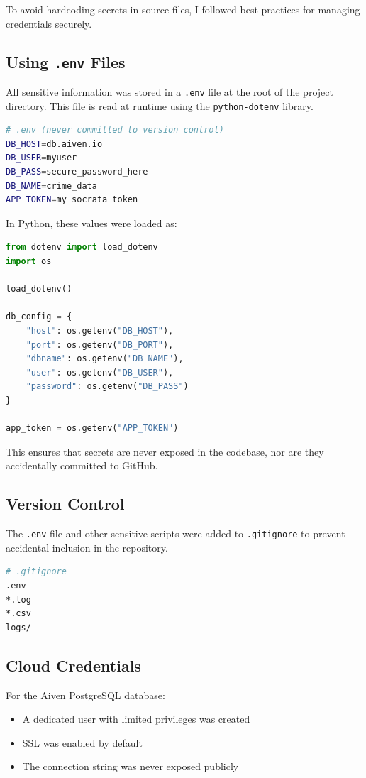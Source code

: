 \documentclass[12pt]{article}
\begin{document}
To avoid hardcoding secrets in source files, I followed best practices for managing credentials securely.

\subsection*{Using \texttt{.env} Files}
All sensitive information was stored in a \texttt{.env} file at the root of the project directory. This file is read at runtime using the \texttt{python-dotenv} library.

\begin{lstlisting}[language=bash]
# .env (never committed to version control)
DB_HOST=db.aiven.io
DB_USER=myuser
DB_PASS=secure_password_here
DB_NAME=crime_data
APP_TOKEN=my_socrata_token
\end{lstlisting}

In Python, these values were loaded as:

\begin{lstlisting}[language=python]
from dotenv import load_dotenv
import os

load_dotenv()

db_config = {
    "host": os.getenv("DB_HOST"),
    "port": os.getenv("DB_PORT"),
    "dbname": os.getenv("DB_NAME"),
    "user": os.getenv("DB_USER"),
    "password": os.getenv("DB_PASS")
}

app_token = os.getenv("APP_TOKEN")
\end{lstlisting}

This ensures that secrets are never exposed in the codebase, nor are they accidentally committed to GitHub.

\subsection*{Version Control}
The \texttt{.env} file and other sensitive scripts were added to \texttt{.gitignore} to prevent accidental inclusion in the repository.

\begin{lstlisting}[language=bash]
# .gitignore
.env
*.log
*.csv
logs/
\end{lstlisting}

\subsection*{Cloud Credentials}
For the Aiven PostgreSQL database:
\begin{itemize}
    \item A dedicated user with limited privileges was created
    \item SSL was enabled by default
    \item The connection string was never exposed publicly
\end{itemize}
\end{document}

